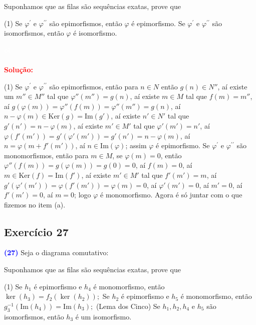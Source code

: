 \documentclass[11pt,a4paper]{article}
\newcommand{\exercicio}[1]{\subsection{Exercício #1} \textcolor{blue}{\bf(#1)}}
\newcommand{\dividiritens}[1]{\begin{tasks}[counter-format={(tsk[a])},label-width=3.6ex, label-format = {\bfseries}, column-sep = {0pt}](1) #1 \end{tasks}}
\newcommand{\pers}[1]{\textcolor{Floresta}{$\negrito{(#1)} $}}
\newcommand{\solucao}[1]{
\textbf{\textcolor{white}{oi}\\ \\ \textcolor{red}{Solução:}} #1}
\begin{document}
Suponhamos que as filas são sequências exatas, prove que
\dividiritens{
\task[\pers{a}] Se $\varphi^\prime$ e $\varphi^{\prime \prime}$ são epimorfismos, então $\varphi$ é epimorfismo.
\task[\pers{b}] Se $\varphi^\prime$ e $\varphi^{\prime \prime}$ são isomorfismos, então $\varphi$ é isomorfismo.
}
\solucao{
\dividiritens{
\task[\pers{a}] Se $\varphi^\prime$ e $\varphi^{\prime \prime}$ são epimorfismos, então para $n\in N$ então $g(n)\in N''$, aí existe um $m''\in M''$ tal que $\varphi''(m'')=g(n)$, aí existe $m\in M$ tal que $f(m)=m''$, aí $g(\varphi(m))=\varphi''(f(m))=\varphi''(m'')=g(n)$, aí $n-\varphi(m)\in\mathrm{Ker}(g)=\mathrm{Im}(g')$, aí existe $n'\in N'$ tal que $g'(n')=n-\varphi(m)$, aí existe $m'\in M'$ tal que $\varphi'(m')=n'$, aí $\varphi(f'(m'))=g'(\varphi'(m'))=g'(n')=n-\varphi(m)$, aí $n=\varphi(m+f'(m'))$, aí $n\in\mathrm{Im}(\varphi)$; assim $\varphi$ é epimorfismo.
\task[\pers{b}] Se $\varphi^\prime$ e $\varphi^{\prime \prime}$ são monomorfismos, então para $m\in M$, se $\varphi(m)=0$, então $\varphi''(f(m))=g(\varphi(m))=g(0)=0$, aí $f(m)=0$, aí $m\in\mathrm{Ker}(f)=\mathrm{Im}(f')$, aí existe $m'\in M'$ tal que $f'(m')=m$, aí $g'(\varphi'(m'))=\varphi(f'(m'))=\varphi(m)=0$, aí $\varphi'(m')=0$, aí $m'=0$, aí $f'(m')=0$, aí $m=0$; logo $\varphi$ é monomorfismo. Agora é só juntar com o que fizemos no item (a).
}
}
\exercicio{27} Seja o diagrama comutativo:
\begin{center}
\end{center}
Suponhamos que as filas são sequências exatas, prove que
\dividiritens{
\task[\pers{a}] Se $h_1$ é epimorfismo e $h_4$ é monomorfismo, então $\ker(h_3) = f_2(\ker(h_2));$
\task[\pers{b}] Se $h_2$ é epimorfismo e $h_5$ é monomorfismo, então $g_3^{-1}(\mbox{Im}(h_4)) = \mbox{Im}(h_3);$
\task[\pers{c}] (Lema dos Cinco) Se $h_1, h_2, h_4$ e $h_5$ são isomorfismos, então $h_3$ é um isomorfismo.
}
\end{document}
